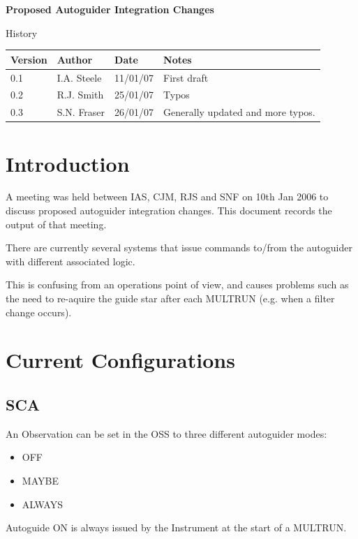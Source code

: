 \documentclass{article}
\begin{document}
\centerline{\Large{\bf Proposed Autoguider Integration Changes}}
\vspace*{0.2cm}
\centerline{\Large History}
\begin{center}
\begin{tabular}{|l|l|l|p{20em}|}
\hline
{\bf Version} & {\bf Author} & {\bf Date} & {\bf Notes} \\
\hline
0.1 & I.A. Steele & 11/01/07  & First draft \\
\hline
0.2 & R.J. Smith & 25/01/07 & Typos\\
\hline
0.3 & S.N. Fraser & 26/01/07 & Generally updated and more typos.\\
\hline
\end{tabular}
\end{center}
\newpage
\tableofcontents
\listoffigures
\listoftables

\section{Introduction}

A meeting was held between IAS, CJM, RJS and SNF on 10th Jan 2006
to discuss proposed autoguider integration changes.  This
document records the output of that meeting.

There are currently several systems that issue
commands to/from the autoguider with different
associated logic.
 
This is confusing from an operations point of view, and causes
problems such as the need to re-aquire the guide
star after each MULTRUN (e.g. when a filter change
occurs).

\section{Current Configurations}

\subsection{SCA}

An {\rm Observation} can be set in the OSS to three different
autoguider modes:

\begin{itemize}
\item OFF
\item MAYBE
\item ALWAYS
\end{itemize}

Autoguide ON is always issued by the Instrument at the
start of a MULTRUN.
\end{document}
